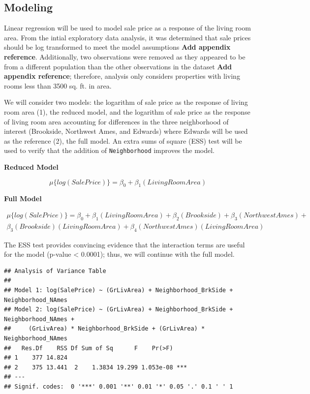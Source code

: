 \documentclass[american,]{article}
\begin{document}
\hypertarget{modeling}{%
\subsection{Modeling}\label{modeling}}

Linear regression will be used to model sale price as a response of the
living room area. From the intial exploratory data analysis, it was
determined that sale prices should be log transformed to meet the model
assumptions \textbf{Add appendix reference}. Additionally, two
observations were removed as they appeared to be from a different
population than the other observations in the dataset \textbf{Add
appendix reference}; therefore, analysis only considers properties with
living rooms less than 3500 sq. ft. in area.

We will consider two models: the logarithm of sale price as the response
of living room area (1), the reduced model, and the logarithm of sale
price as the response of living room area accounting for differences in
the three neighborhood of interest (Brookside, Northwest Ames, and
Edwards) where Edwards will be used as the reference (2), the full
model. An extra sums of square (ESS) test will be used to verify that
the addition of \texttt{Neighborhood} improves the model.

\textbf{Reduced Model}

\begin{equation}
\mu \lbrace log(SalePrice) \rbrace = \beta_0 + \beta_1(LivingRoomArea) \label{eq:reduced}
\end{equation}

\textbf{Full Model}

\begin{align}
\mu \lbrace log(SalePrice) \rbrace = \beta_0 + \beta_1(LivingRoomArea) +  \beta_2(Brookside) +\beta_3(NorthwestAmes) + \nonumber\\
\beta_3(Brookside)(LivingRoomArea) + \beta_4(NorthwestAmes)(LivingRoomArea) \label{eq:full}
\end{align}

The ESS test provides convincing evidence that the interaction terms are
useful for the model (p-value \textless{} 0.0001); thus, we will
continue with the full model.

\begin{verbatim}
## Analysis of Variance Table
## 
## Model 1: log(SalePrice) ~ (GrLivArea) + Neighborhood_BrkSide + Neighborhood_NAmes
## Model 2: log(SalePrice) ~ (GrLivArea) + Neighborhood_BrkSide + Neighborhood_NAmes + 
##     (GrLivArea) * Neighborhood_BrkSide + (GrLivArea) * Neighborhood_NAmes
##   Res.Df    RSS Df Sum of Sq      F    Pr(>F)    
## 1    377 14.824                                  
## 2    375 13.441  2    1.3834 19.299 1.053e-08 ***
## ---
## Signif. codes:  0 '***' 0.001 '**' 0.01 '*' 0.05 '.' 0.1 ' ' 1
\end{verbatim}
\end{document}
